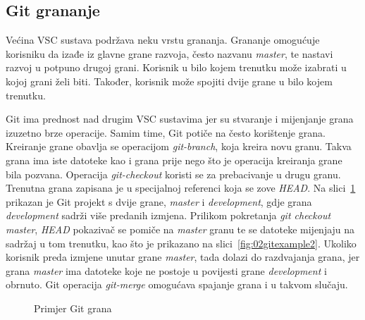 \subsection{Git grananje}
Većina VSC sustava podržava neku vrstu grananja. Grananje omogućuje korisniku da izađe iz glavne
grane razvoja, često nazvanu \textit{master}, te nastavi razvoj u potpuno drugoj grani. Korisnik u
bilo kojem trenutku može izabrati u kojoj grani želi biti. Također, korisnik može spojiti dvije
grane u bilo kojem trenutku.

Git ima prednost nad drugim VSC sustavima jer su stvaranje i mijenjanje grana izuzetno brze
operacije. Samim time, Git potiče na često korištenje grana. Kreiranje grane obavlja se operacijom
\textit{git-branch}, koja kreira novu granu. Takva grana ima iste datoteke kao i grana prije nego
što je operacija kreiranja grane bila pozvana. Operacija \textit{git-checkout} koristi se za
prebacivanje u drugu granu. Trenutna grana zapisana je u specijalnoj referenci koja se zove
\textit{HEAD}. Na slici~\ref{fig:02gitexample} prikazan je Git projekt s dvije grane,
\textit{master} i \textit{development}, gdje grana \textit{development} sadrži više predanih
izmjena. Prilikom pokretanja \textit{git checkout master}, \textit{HEAD} pokazivač se pomiče na
\textit{master} granu te se datoteke mijenjaju na sadržaj u tom trenutku, kao što je prikazano na
slici~\ref{fig:02gitexample2}. Ukoliko korisnik preda izmjene unutar grane \textit{master}, tada
dolazi do razdvajanja grana, jer grana \textit{master} ima datoteke koje ne postoje u povijesti
grane \textit{development} i obrnuto. Git operacija \textit{git-merge} omogućava spajanje grana i u
takvom slučaju.

\begin{figure}[h]
    \centering

    \caption{Primjer Git grana}%
    \label{fig:02gitexample}
\end{figure}

